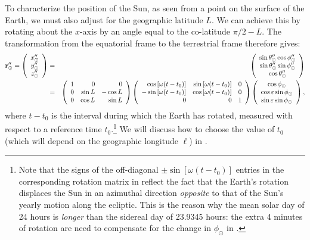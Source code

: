 To characterize the position of the Sun, as seen from a point on the surface of the Earth, we must also adjust for the geographic latitude $L$.  We can achieve this by rotating about the $x$-axis by an angle equal to the co-latitude $\pi / 2 - L$.  The transformation from the equatorial frame to the terrestrial frame therefore gives: 
\begin{eqnarray}
\VV r''_\odot =
\left( \begin{array}{c} x''_\odot \\ y''_\odot \\ z''_\odot \end{array} \right) &=&
\left( \begin{array}{c} \sin \theta''_\odot \cos \phi''_\odot \\ \sin \theta''_\odot \sin \phi''_\odot \\ \cos \theta''_\odot \end{array} \right) \nn
&=& \left( \begin{array}{r r r}
1 & 0 & 0 \\
0 & \sin L & - \cos L \\
0 & \cos L & \sin L
\end{array} \right)
\left( \begin{array}{r r r}
\cos \left[ \omega (t - t_0) \right] & \sin \left[ \omega (t - t_0) \right] & 0 \\
-\sin \left[ \omega (t - t_0) \right] & \cos \left[ \omega (t - t_0) \right] & 0 \\
0 & 0 & 1
\end{array} \right)
\left( \begin{array}{c} \cos \phi_\odot  \\ \cos \varepsilon \sin \phi_\odot \\ \sin \varepsilon \sin \phi_\odot \end{array} \right),
\la{eq:terrestrial}
\end{eqnarray}
where $t - t_0$ is the interval during which the Earth has rotated, measured with respect to a reference time $t_0$.\footnote{Note that the signs of the off-diagonal $\pm \sin[\omega(t-t_0)]$ entries in the corresponding rotation matrix in  reflect the fact that the Earth's rotation displaces the Sun in an azimuthal direction {\it opposite} to that of the Sun's yearly motion along the ecliptic.  This is the reason why the mean solar day of 24 hours is {\it longer} than the sidereal day of 23.9345 hours: the extra 4 minutes of rotation are need to compensate for the change in $\phi_\odot$ in .}  We will discuss how to choose the value of $t_0$ (which will depend on the geographic longitude $\ell$) in .

